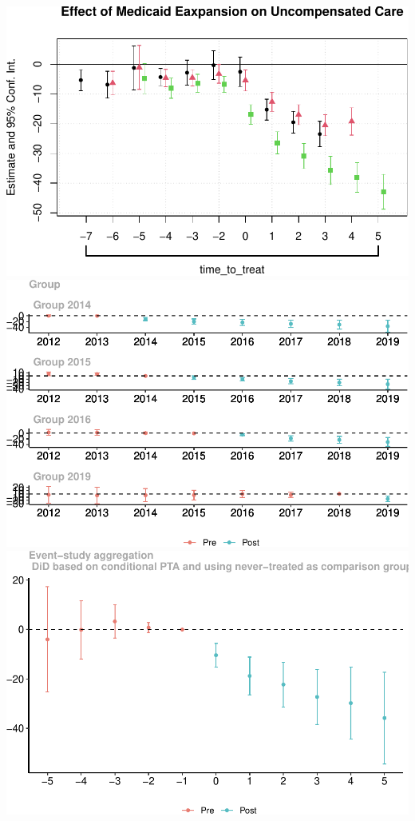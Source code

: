 \documentclass[
]{article}
\begin{document}
\includegraphics{Report_files/figure-latex/Figures-6.pdf}
\includegraphics{Report_files/figure-latex/Figures-7.pdf}
\includegraphics{Report_files/figure-latex/Figures-8.pdf}
\end{document}

